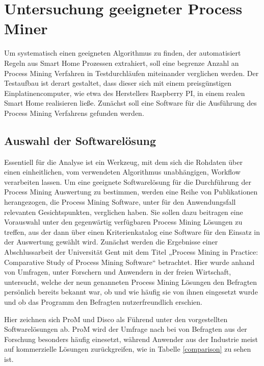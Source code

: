 \chapter{Untersuchung geeigneter Process Miner}\label{chap:approach}
Um systematisch einen geeigneten Algorithmus zu finden, der automatisiert Regeln aus Smart Home Prozessen extrahiert, soll eine begrenze Anzahl an Process Mining Verfahren in Testdurchläufen miteinander verglichen werden. Der Testaufbau ist derart gestaltet, dass dieser sich mit einem preisgünstigen Einplatinencomputer, wie etwa des Herstellers Raspberry PI, in einem realen Smart Home realisieren ließe. Zunächst soll eine Software für die Ausführung des Process Mining Verfahrens gefunden werden.

\section{Auswahl der Softwarelösung}
Essentiell für die Analyse ist ein Werkzeug, mit dem sich die Rohdaten über einen einheitlichen, vom verwendeten Algorithmus unabhängigen, Workflow verarbeiten lassen. Um eine geeignete Softwarelösung für die Durchführung der Process Mining Auswertung zu bestimmen, werden eine Reihe von Publikationen herangezogen, die  Process Mining Software, unter für den Anwendungsfall relevanten Gesichtspunkten, verglichen haben. Sie sollen dazu beitragen eine Vorauswahl unter den gegenwärtig verfügbaren Process Mining Lösungen zu treffen, aus der dann über einen Kriterienkatalog eine Software für den Einsatz in der Auswertung gewählt wird. 
Zunächst werden die Ergebnisse einer Abschlussarbeit der Universität Gent mit dem Titel „Process Mining in Practice: Comparative Study of Process Mining Software“ \cite{verstraete} betrachtet. Hier wurde anhand von Umfragen, unter Forschern und Anwendern in der freien Wirtschaft, untersucht, welche der neun genanneten Process Mining Lösungen den Befragten persönlich bereits bekannt war, ob und wie häufig sie von ihnen eingesetzt wurde und ob das Programm den Befragten nutzerfreundlich erschien.

Hier zeichnen sich ProM und Disco als Führend unter den vorgestellten Softwarelösungen ab. ProM wird der Umfrage nach bei von Befragten aus der Forschung besonders häufig einesetzt, während Anwender aus der Industrie meist auf kommerzielle Lösungen zurückgreifen, wie in Tabelle \ref{comparison} zu sehen ist.

